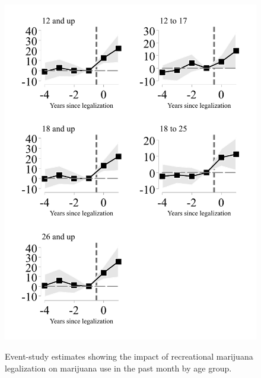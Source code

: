 \documentclass[12pt]{article}%
\begin{document}
\begin{figure}[h]
    \caption{Event-study estimates showing the impact of recreational marijuana legalization on marijuana use in the past month by age group.}
    \includegraphics[width=.75\linewidth]{../output/plots/bw-event-study-estimates-ln-mj_use_30-bw.pdf}
    \label{fig:leads-and-lags-mj-past-month}
\end{figure}
\end{document}

